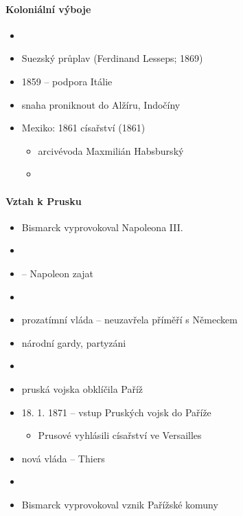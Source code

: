 \paragraph{Koloniální výboje}
\begin{itemize}
\item {}
\item Suezský průplav (Ferdinand Lesseps; 1869)
\item 1859 -- podpora Itálie
\item snaha proniknout do Alžíru, Indočíny
\item Mexiko: 1861 císařství (1861)
	\begin{itemize}
	\item arcivévoda Maxmilián Habsburský
	\item {}
	\end{itemize}
\end{itemize}

\paragraph{Vztah k Prusku}
\begin{itemize}
\item Bismarck vyprovokoval Napoleona III.
\item {}
\item {} -- Napoleon zajat
\item {}
\item prozatímní vláda -- neuzavřela příměří s Německem
\item národní gardy, partyzáni
\item {}
\item pruská vojska obklíčila Paříž
\item 18. 1. 1871 -- vstup Pruských vojsk do Paříže
	\begin{itemize}
	\item Prusové vyhlásili císařství ve Versailles
	\end{itemize}
\item nová vláda -- Thiers
\item {}
\item Bismarck vyprovokoval vznik Pařížské komuny
\end{itemize}

